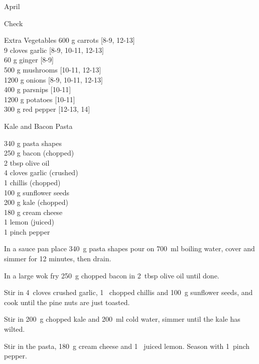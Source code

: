 \begin{menu}{April}
\begin{shoppinglist}{Check}
      \end{shoppinglist}%
      \begin{shoppinglist}{Extra Vegetables}
      600 g carrots {\scriptsize[8-9, 12-13]}\\
      9 cloves garlic {\scriptsize[8-9, 10-11, 12-13]}\\
      60 g ginger {\scriptsize[8-9]}\\
      500 g mushrooms {\scriptsize[10-11, 12-13]}\\
      1200 g onions {\scriptsize[8-9, 10-11, 12-13]}\\
      400 g parsnips {\scriptsize[10-11]}\\
      1200 g potatoes {\scriptsize[10-11]}\\
      300 g red pepper {\scriptsize[12-13, 14]}\\
      \end{shoppinglist}%
      \par\vfil %
    \vfil\clearpage
  
    \begin{recipe}{2}{Kale and Bacon Pasta}%
		\begin{ingredients}
		340 g pasta shapes  \\
	250 g bacon (chopped) \\
	2 tbsp olive oil  \\
	4 cloves garlic (crushed) \\
	1  chillis (chopped) \\
	100 g sunflower seeds  \\
	200 g kale (chopped) \\
	180 g cream cheese  \\
	1  lemon (juiced) \\
	1 pinch pepper  \\
	
		\end{ingredients}
	
	
    \begin{instructions}
    \item 
    In a
    sauce pan
    place
    340~g  pasta shapes
    pour on
    700~ml  boiling water,
    cover and simmer for 12 minutes, then drain.
  \item 
        In a large wok fry
        250~g chopped bacon
        in
        2~tbsp  olive oil
        until done.
      \item 
        Stir in
        4~cloves crushed garlic,
        1~ chopped chillis
        and
        100~g  sunflower seeds,
        and cook until the pine nuts are just toasted.
      \item 
        Stir in
        200~g chopped kale
        and
        200~ml  cold water,
        simmer until the kale has wilted.
      \item 
        Stir in the pasta,
        180~g  cream cheese
        and
        1~ juiced lemon.
        Season with
        1~pinch  pepper.
      

\end{instructions}
\end{recipe}
\end{menu}
